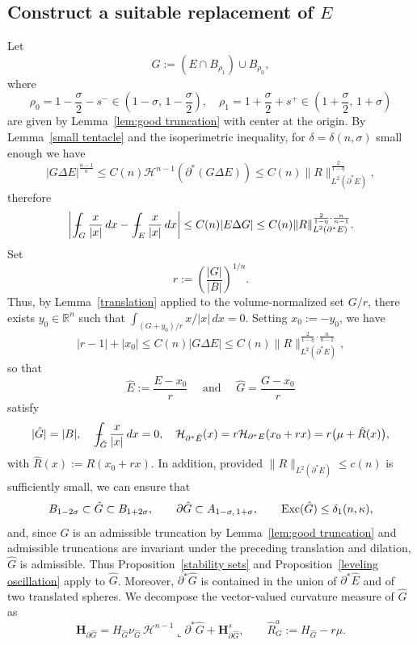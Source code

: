 \documentclass[reqno,11pt]{amsart}
\def\sz{\sigma}
\numberwithin{equation}{section}
\theoremstyle{remark}
\newcommand{\mean}[1]{\,-\hskip-1.08em\int_{#1}} %
\begin{document}
 \subsection{Construct a suitable replacement of $E$}
 Let 
$$ G:=(  E\cap B_{\rho_1})\cup B_{\rho_0},$$
where 
$$\rho_0=1-\frac\sz 2-s^-\in \left(1-\sz,\,1-\frac \sz 2\right),\quad \rho_1=1+\frac\sz 2+s^+\in \left(1+\frac \sz 2,\,1+\sz\right)$$ 
 are given by  Lemma~\ref{lem:good truncation} with center at the origin. 
By Lemma~\ref{small tentacle} and the isoperimetric inequality, for $\delta=\delta(n,\sigma)$ small enough we have
 $$|G\Delta E|^{\frac{n-1}n}\le C(n) \mathscr H^{n-1}(\partial^*(G\Delta E))\le C(n)\|R\|_{L^2(\partial^*E)}^{\frac{2}{1-\eta}},$$
therefore
$$ \left|\mean{G} \frac{x}{|x|}\, dx- \mean{E} \frac{x}{|x|}\,dx\right|\le C(n)|E\Delta G| \leq  C(n)\|R\|_{L^2(\partial^*E)}^{\frac{2}{1-\eta}\cdot \frac{n}{n-1}}.$$
Set
\[
r:=\left(\frac{|G|}{|B|}\right)^{1/n}.
\]
Thus, by Lemma~\ref{translation} applied to the volume-normalized set $G/r$,
there exists $y_0\in \mathbb R^n$ such that
$\int_{(G+y_0)/r}x/|x|\,dx=0$.  Setting $x_0:=-y_0$, we have
\begin{equation}\label{r x0}
|r-1|+|x_0|\le C(n) |G\Delta E|\le C(n)\|R\|_{L^2(\partial^*E)}^{\frac{2}{1-\eta}\cdot \frac{n}{n-1}},
\end{equation}
so that
$$\hat E:=\frac {E-x_0}{r}  \quad \text{ and } \quad \hat G=\frac {G-x_0}{r}$$
 satisfy
\begin{equation}\label{mean curvature hat}
  |\hat G|=|B|,\quad \mean{\hat G}\frac{x}{|x|}\,dx=0,\quad \mathcal H_{\partial^* \hat E}(x)=r\mathcal H_{\partial^* E}(x_0+rx)= r \big(\mu+\hat R(x)\big),
\end{equation}
with $\hat R(x):=R(x_0+rx)$.
In addition, provided $\|R\|_{L^2(\partial^*E)}\le c(n)$ is sufficiently small,  we can ensure that
\[
B_{1-2\sigma}\subset \hat G\subset B_{1+2\sigma},
\qquad
\partial \hat G\subset A_{1-\sz,\,1+\sz},
\qquad
{\rm Exc}(\hat G)\le\delta_1(n,\kappa),
\]
and, since $G$ is an admissible truncation by Lemma~\ref{lem:good truncation}
and admissible truncations are invariant under the preceding translation and
dilation, $\hat G$ is admissible. Thus Proposition~\ref{stability sets} and
Proposition~\ref{leveling oscillation} apply to $\hat G$.
Moreover, $\partial^*\hat G$ is contained in the union of
$\partial^*\hat E$ and of two translated spheres. We decompose the
vector-valued curvature measure of $\hat G$ as
\begin{equation*}
\mathbf H_{\partial\hat G}
=H_{\hat G}\nu_{\hat G}\,\mathscr H^{n-1}\llcorner\partial^*\hat G
+\mathbf H^s_{\partial\hat G},
\qquad
\hat R^a_G:=H_{\hat G}-r\mu .
\end{equation*}
\end{document}
